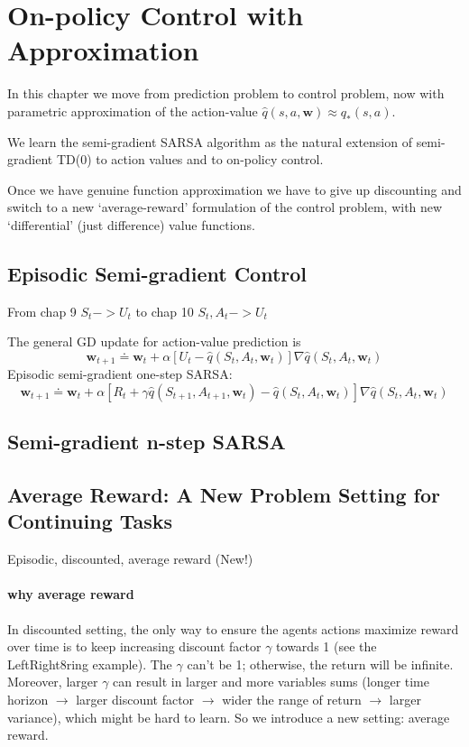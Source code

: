\documentclass[sutton_barto_notes.tex]{subfiles}
\begin{document}
\newpage
\section{On-policy Control with Approximation}

In this chapter we move from prediction problem to control problem, now with parametric approximation of the action-value $\hat{q}(s,a,\bm{w})\approx q_*(s,a)$.

We learn the semi-gradient SARSA algorithm as the natural extension of semi-gradient TD(0) to action values and to on-policy control.

Once we have genuine function approximation we have to give up discounting and switch to a new `average-reward' formulation of the control problem, with new `differential' (just difference) value functions.

\subsection{Episodic Semi-gradient Control}

From chap 9 $S_t -> U_t$ to chap 10 $S_t, A_t -> U_t$

The general GD update for action-value prediction is
$$\bm{w}_{t+1} \doteq \bm{w}_t + \alpha[U_t - \hat{q}(S_t, A_t, \bm{w}_t)]\nabla \hat{q}(S_t, A_t, \bm{w}_t)$$
Episodic semi-gradient one-step SARSA:
$$\bm{w}_{t+1} \doteq \bm{w}_t + \alpha[R_{t} + \gamma\hat{q}(S_{t+1}, A_{t+1}, \bm{w}_t) - \hat{q}(S_t, A_t, \bm{w}_t)]\nabla\hat{q}(S_t, A_t, \bm{w}_t)$$

\subsection{Semi-gradient n-step SARSA}
\subsection{Average Reward: A New Problem Setting for Continuing Tasks}
Episodic, discounted, average reward (New!)

\paragraph{why average reward} In discounted setting, the only way to ensure the agents actions maximize reward over time is to keep increasing discount factor $\gamma$ towards 1 (see the LeftRight8ring example). The $\gamma$ can't be 1; otherwise, the return will be infinite. Moreover, larger $\gamma$ can result in larger and more variables sums (longer time horizon $\to$ larger discount factor $\to$ wider the range of return $\to$ larger variance), which might be hard to learn. So we introduce a new setting: average reward.
\end{document}
